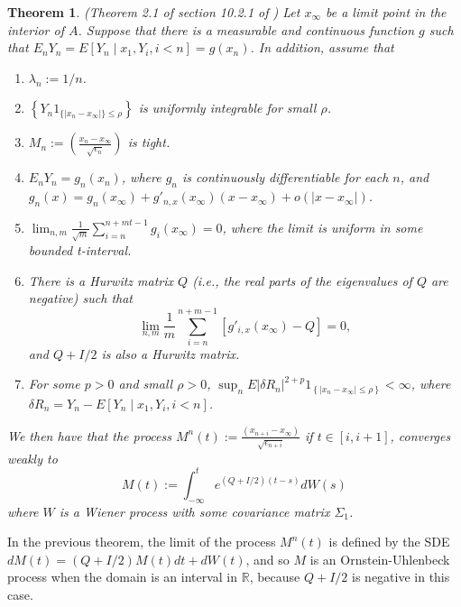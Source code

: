 \documentclass[12pt,english]{article}
\newtheorem{theorem}{Theorem}
\begin{document}
\begin{theorem} 
(Theorem 2.1 of section 10.2.1 of \cite{kushner}) 
Let $x_{\infty}$ be a limit point in the interior of $A$. Suppose that there is a measurable and continuous function $g$ such that $E_{n}Y_{n}=E\left[Y_{n}\mid x_{1},Y_{i},i<n\right]=g\left(x_{n}\right)$. In addition, assume that 

\begin{enumerate}
\item $\lambda_{n}:=1/n$.
\item $\left\{ Y_{n}1_{\{\left|x_{n}-x_{\infty}\right|\}\leq\rho}\right\}$ is uniformly integrable for small $\rho$.
\item $M_{n}:=\left(\frac{x_{n}-x_{\infty}}{\sqrt{\epsilon_{n}}}\right)$ is tight.
\item $E_{n}Y_{n}=g_{n}\left(x_{n}\right)$, where $g_{n}$ is continuously differentiable for each $n$, and $g_{n}\left(x\right)=g_{n}\left(x_{\infty}\right)+g'_{n,x}\left(x_{\infty}\right)\left(x-x_{\infty}\right)+o\left(\left|x-x_{\infty}\right|\right)$.
\item $\lim_{n,m}\frac{1}{\sqrt{m}}\sum_{i=n}^{n+mt-1}g_{i}\left(x_{\infty}\right)=0$, where the limit is uniform in some bounded t-interval.
\item There is a Hurwitz matrix $Q$ (i.e., the real parts of the eigenvalues of $Q$ are negative) such that 
\[
\lim_{n,m}\frac{1}{m}\sum_{i=n}^{n+m-1}\left[g'_{i,x}\left(x_{\infty}\right)-Q\right]=0, 
\]
and $Q+I/2$ is also a Hurwitz matrix.
\item For some $p>0$ and small $\rho>0$, $\sup_{n}E\left|\delta R_{n}\right|^{2+p}1_{\left\{ \left|x_{n}-x_{\infty}\right|\leq\rho\right\} }<\infty$, where $\delta R_{n}=Y_{n}-E\left[Y_{n}\mid x_{1},Y_{i},i<n\right]$.
\end{enumerate}

We then have that the process $M^{n}\left(t\right):=\frac{\left(x_{n+i}-x_{\infty}\right)}{\sqrt{\epsilon_{n+i}}}$ if $t\in \left[i,i+1\right]$, converges weakly to 
\[
M\left(t\right):=\int_{-\infty}^{t}e^{\left(Q+I/2\right)\left(t-s\right)}dW\left(s\right)
\]
where $W$ is a Wiener process with some covariance matrix $\Sigma_{1}$.
\end{theorem}

In the previous theorem, the limit of the process $M^{n}\left(t\right)$ is defined by the SDE $dM(t)=(Q+I/2)M(t)dt+dW(t)$, and so $M$ is an Ornstein-Uhlenbeck process when the domain is an interval in $\mathbb{R}$, because $Q+I/2$ is negative in this case.





\end{document}
